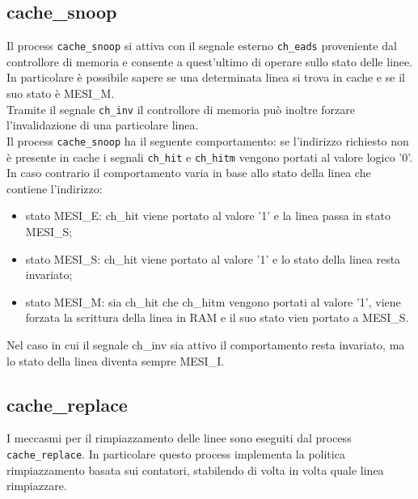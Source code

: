 \subsection{cache\_snoop}

Il process \texttt{cache\_snoop} si attiva con il segnale esterno \texttt{ch\_eads} proveniente dal controllore di memoria e consente a quest'ultimo di operare sullo stato delle linee.\\
In particolare \`e possibile sapere se una determinata linea si trova in cache e se il suo stato \`e MESI\_M.\\
Tramite il segnale \texttt{ch\_inv} il controllore di memoria pu\`o inoltre forzare l'invalidazione di una particolare linea.\\

Il process \texttt{cache\_snoop} ha il seguente comportamento: se l'indirizzo richiesto non \`e presente in cache i segnali \texttt{ch\_hit} e \texttt{ch\_hitm} vengono portati al valore logico '0'. In caso contrario il comportamento varia in base allo stato della linea che contiene l'indirizzo:
\begin{itemize}
  \item stato MESI\_E: ch\_hit viene portato al valore '1' e la linea passa in stato MESI\_S;
  \item stato MESI\_S: ch\_hit viene portato al valore '1' e lo stato della linea resta invariato;
  \item stato MESI\_M: sia ch\_hit che ch\_hitm vengono portati al valore '1', viene forzata la scrittura della linea in RAM e il suo stato vien portato a MESI\_S.
\end{itemize}

Nel caso in cui il segnale ch\_inv sia attivo il comportamento resta invariato, ma lo stato della linea diventa sempre MESI\_I. 

\subsection{cache\_replace}

I meccasmi per il rimpiazzamento delle linee sono eseguiti dal process \texttt{cache\_replace}. In particolare questo process implementa la politica rimpiazzamento basata sui contatori, stabilendo di volta in volta quale linea rimpiazzare.\\

